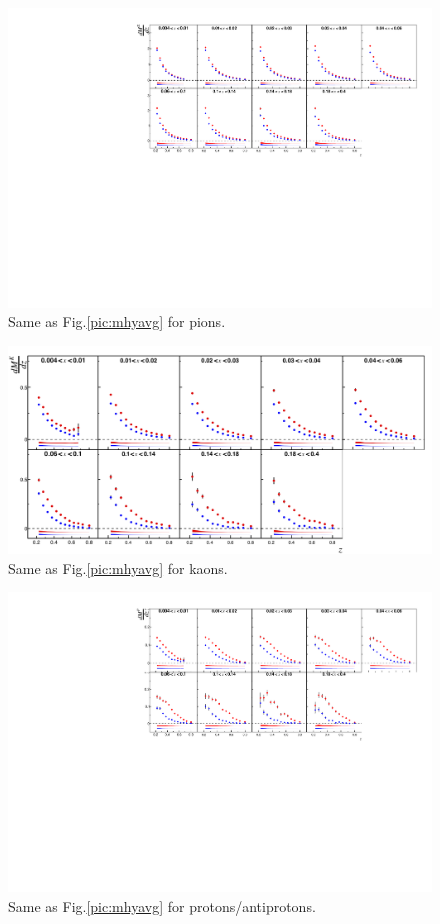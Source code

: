 \begin{figure}[!h]
  \centering
	\includegraphics[scale=0.85]{./gfx/piyavg.pdf}
	\caption{Same as Fig.\ref{pic:mhyavg} for pions.}
	\label{pic:mpiyavg}
\end{figure}

\newpage
\null
\vfill
\begin{figure}[!h]
  \centering
	\includegraphics[scale=0.85]{./gfx/Kyavg.png}
	\caption{Same as Fig.\ref{pic:mhyavg} for kaons.}
	\label{pic:mkyavg}
\end{figure}

\begin{figure}[!h]
  \centering
	\includegraphics[scale=0.85]{./gfx/pyavg.pdf}
	\caption{Same as Fig.\ref{pic:mhyavg} for protons/antiprotons.}
	\label{pic:mpyavg}
\end{figure}
\vfill
\newpage

